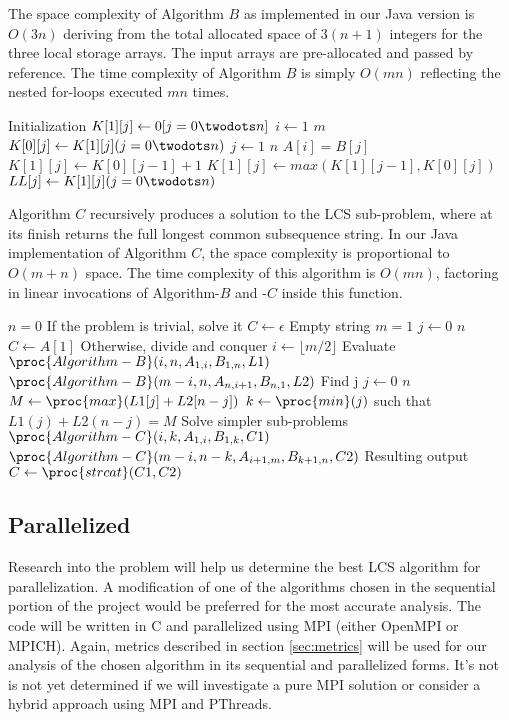The space complexity of Algorithm $B$ as implemented in our Java version is $O(3n)$ deriving from the total allocated space of $3(n+1)$ integers for the three local storage arrays. The input arrays are pre-allocated and passed by reference. The time complexity of Algorithm $B$ is simply $O(mn)$ reflecting the nested for-loops executed $mn$ times.

\begin{codebox}
\li	\Comment Initialization
\li $K[1][j] \gets 0 [j=0 \twodots n]$
\li \For $i \gets 1$ \To $m$ 
\li	\Do
\li 	$K[0][j] \gets K[1][j] (j=0\twodots n)$
\li 	\For $j \gets 1$ \To $n$ 
\li		\Do
\li			\If $A[i] = B[j]$ 
\li			\Then 
\li				$K[1][j] \gets K[0][j-1] + 1$
\li			\Else
\li				$K[1][j] \gets max(K[1][j-1], K[0][j])$
			\End
		\End
	\End
\li	$LL[j] \gets K[1][j] (j=0\twodots n)$
\end{codebox}

Algorithm $C$ recursively produces a solution to the LCS sub-problem, where at its finish returns the full longest common subsequence string. In our Java implementation of Algorithm $C$, the space complexity is proportional to $O(m + n)$ space. The time complexity of this algorithm is $O(mn)$, factoring in linear invocations of Algorithm-$B$ and -$C$ inside this function.

\begin{codebox}
\li \If $n = 0$ 
\li	\Then 
\li		\Comment If the problem is trivial, solve it
\li		$C \gets \epsilon$ \Comment Empty string
\li \ElseIf $m = 1$
\li	\Then
\li 	\For $j \gets 0$ \To $n$ 
\li     \Do
\li     	$C \gets A[1]$
\li		\End
\li \ElseNoIf
\li 	\Comment Otherwise, divide and conquer
\li 	$i \gets \lfloor m/2 \rfloor$
\li		\Comment Evaluate
\li		$\proc{Algorithm-B}(i, n, A_{1,i},  B_{1,n}, L1)$
\li		$\proc{Algorithm-B}(m-i, n, A_{n,i+1},  B_{n,1}, L2)$
\li		\Comment Find j
\li		\For $j \gets 0$ \To $n$
\li		\Do
\li			$M \gets \proc{max}(L1[j] + L2[n-j])$
\li			$k \gets \proc{min}(j)$ such that $L1(j) + L2(n-j) = M$
\li		\End
\li 	\Comment Solve simpler sub-problems
\li		$\proc{Algorithm-C}(i,k,A_{1,i}, B_{1,k}, C1)$
\li		$\proc{Algorithm-C}(m-i,n-k,A_{i+1,m}, B_{k+1,n}, C2)$
\li		\Comment Resulting output
\li		$C \gets \proc{strcat}(C1,C2)$
\li	\End
\end{codebox}

\subsection{Parallelized}
Research into the problem will help us determine the best LCS algorithm for parallelization. A modification of one of the algorithms chosen in the sequential portion of the project would be preferred for the most accurate analysis. The code will be written in C and parallelized using MPI (either OpenMPI or MPICH). Again, metrics described in section \ref{sec:metrics} will be used for our analysis of the chosen algorithm in its sequential and parallelized forms. It's not is not yet determined if we will investigate a pure MPI solution or consider a hybrid approach using MPI and PThreads.
